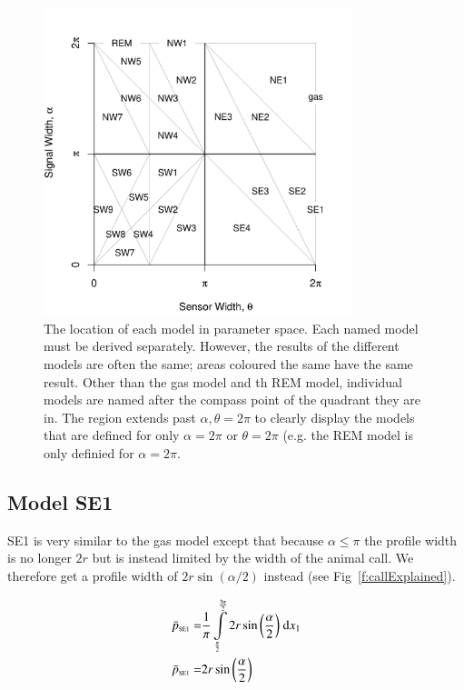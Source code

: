 \begin{figure}[t]
\centering
\includegraphics[width=0.8\textwidth]{../imgs/equalRegions.pdf}
\caption{The location of each model in parameter space. Each named model must be derived separately. However, the results of the different models are often the same; areas coloured the same have the same result. Other than the gas model and th REM model, individual models are named after the compass point of the quadrant they are in. The region extends past $\alpha, \theta=2\pi$ to clearly display the models that are defined for only $\alpha=2\pi$ or $\theta=2\pi$ (e.g. the REM model is only definied for $\alpha=2\pi$.}
\label{f:equalRegions}
\end{figure}


\subsection{Model SE1} \label{SE1}

SE1 is very similar to the gas model except that because $\alpha \le \pi$ the profile width is no longer $2r$ but is instead limited by the width of the animal call. We therefore get a profile width of $2r\sin(\alpha/2)$ instead (see Fig~\ref{f:callExplained}).

\begin{align}
    \bar{p}_{\text{\tiny{SE1}}} =&\frac{1}{\pi} \int\limits_{\frac{\pi}{2}}^{\frac{3 \pi}{2}}2 r \sin{\left (\frac{\alpha}{2} \right )}\;\mathrm{d}x_{1}\label{pSE1Def}\\
    \bar{p}_{\text{\tiny{SE1}}}  =& 2 r \sin{\left (\frac{\alpha}{2} \right )}\label{pSE1Sln}
\end{align}

